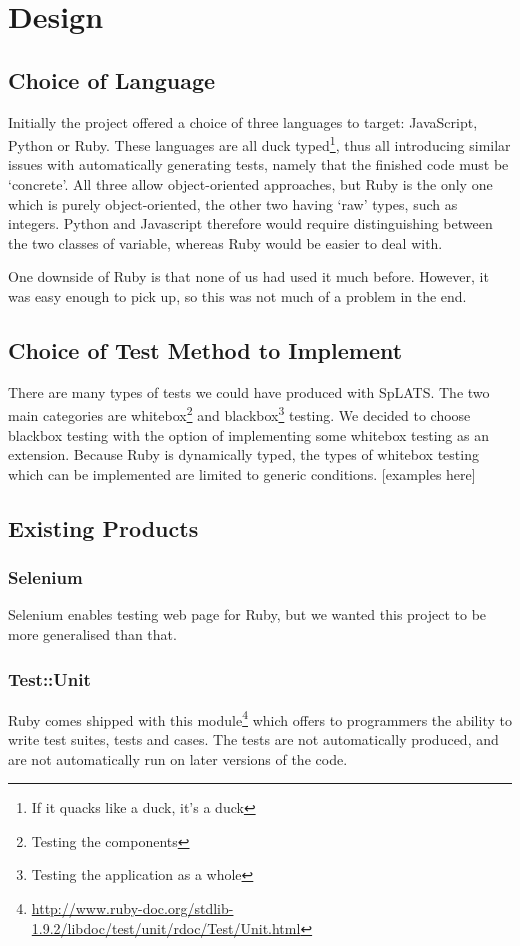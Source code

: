 \chapter{Design}

\section{Choice of Language}
  Initially the project offered a choice of three languages to target: JavaScript, Python or Ruby.
  These languages are all duck typed\footnote{If it quacks like a duck, it's a duck}, thus all introducing similar issues with automatically generating tests, namely that the finished code must be `concrete'.
  All three allow object-oriented approaches, but Ruby is the only one which is purely object-oriented, the other two having `raw' types, such as integers.
  Python and Javascript therefore would require distinguishing between the two classes of variable, whereas Ruby would be easier to deal with.

  One downside of Ruby is that none of us had used it much before.
  However, it was easy enough to pick up, so this was not much of a problem in the end.

\section{Choice of Test Method to Implement}
  There are many types of tests we could have produced with SpLATS.
  The two main categories are whitebox\footnote{Testing the components} and blackbox\footnote{Testing the application as a whole} testing.
  We decided to choose blackbox testing with the option of implementing some whitebox testing as an extension.
  Because Ruby is dynamically typed, the types of whitebox testing which can be implemented are limited to generic conditions.
  [examples here]

\section{Existing Products}
  \subsection{Selenium}
    Selenium enables testing web page for Ruby, but we wanted this project to be more generalised than that.

  \subsection{Test::Unit}
    Ruby comes shipped with this module\footnote{\url{http://www.ruby-doc.org/stdlib-1.9.2/libdoc/test/unit/rdoc/Test/Unit.html}} which offers to programmers the ability to write test suites, tests and cases.
    The tests are not automatically produced, and are not automatically run on later versions of the code.

